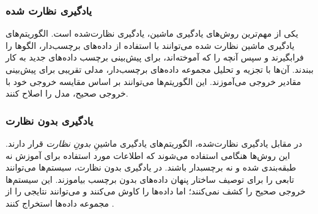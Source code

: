 \subsubsection{یادگیری نظارت شده}
یکی از مهم‌ترین روش‌های یادگیری ماشین، یادگیری نظارت‌شده است. الگوریتم‌های یادگیری ماشین نظارت ‌شده می‌توانند  با استفاده از داده‌های برچسب‌دار، الگوها را فرابگیرند و سپس آنچه را که آموخته‌اند، برای پیش‌بینی برچسب داده‌های جدید به کار ببندند.
آن‌ها با تجزیه و تحلیل مجموعه داده‌های برچسب‌دار، مدلی تقریبی برای پیش‌بینی مقادیر خروجی می‌‌آموزند\cite{mldef}. این الگوریتم‌ها می‌توانند بر اساس مقایسه خروجی خود با خروجی صحیح، مدل را اصلاح کنند.
\subsubsection{یادگیری بدون نظارت}
در مقابل  یادگیری نظارت‌شده، الگوریتم‌های یادگیری ماشینِ
\textit{بدونِ نظارت} 
قرار دارند. این روش‌ها هنگامی‌ استفاده می‌شوند که اطلاعات مورد استفاده برای آموزش نه طبقه‌بندی شده و  نه برچسب\nf دار باشند. در یادگیری بدون نظارت، سیستم‌ها می‌توانند تابعی را برای توصیف ساختار پنهان داده‌های بدون برچسب بیاموزند. این سیستم‌ها خروجی صحیح را کشف نمی‌کنند؛ اما داده‌ها را کاوش می‌کنند و می‌توانند نتایجی را از مجموعه داده‌ها استخراج کنند
\cite{mldef}.


